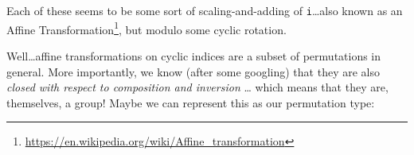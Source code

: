\documentclass[]{article}
\newenvironment{Shaded}{}{}
\newcommand{\CommentTok}[1]{\textcolor[rgb]{0.38,0.63,0.69}{\textit{#1}}}
\newcommand{\DataTypeTok}[1]{\textcolor[rgb]{0.56,0.13,0.00}{#1}}
\newcommand{\DecValTok}[1]{\textcolor[rgb]{0.25,0.63,0.44}{#1}}
\newcommand{\FunctionTok}[1]{\textcolor[rgb]{0.02,0.16,0.49}{#1}}
\newcommand{\KeywordTok}[1]{\textcolor[rgb]{0.00,0.44,0.13}{\textbf{#1}}}
\newcommand{\NormalTok}[1]{#1}
\newcommand{\OperatorTok}[1]{\textcolor[rgb]{0.40,0.40,0.40}{#1}}
\newcommand{\OtherTok}[1]{\textcolor[rgb]{0.00,0.44,0.13}{#1}}
\newcommand{\StringTok}[1]{\textcolor[rgb]{0.25,0.44,0.63}{#1}}
\renewcommand{\href}[2]{#2\footnote{\url{#1}}}
\begin{document}
Each of these seems to be some sort of scaling-and-adding of
\texttt{i}\ldots also known as an
\href{https://en.wikipedia.org/wiki/Affine_transformation}{Affine
Transformation}, but modulo some cyclic rotation.

Well\ldots affine transformations on cyclic indices are a subset of permutations
in general. More importantly, we know (after some googling) that they are also
\emph{closed with respect to composition and inversion} \ldots{} which means
that they are, themselves, a group! Maybe we can represent this as our
permutation type:

\begin{Shaded}
\end{Shaded}
\end{document}
